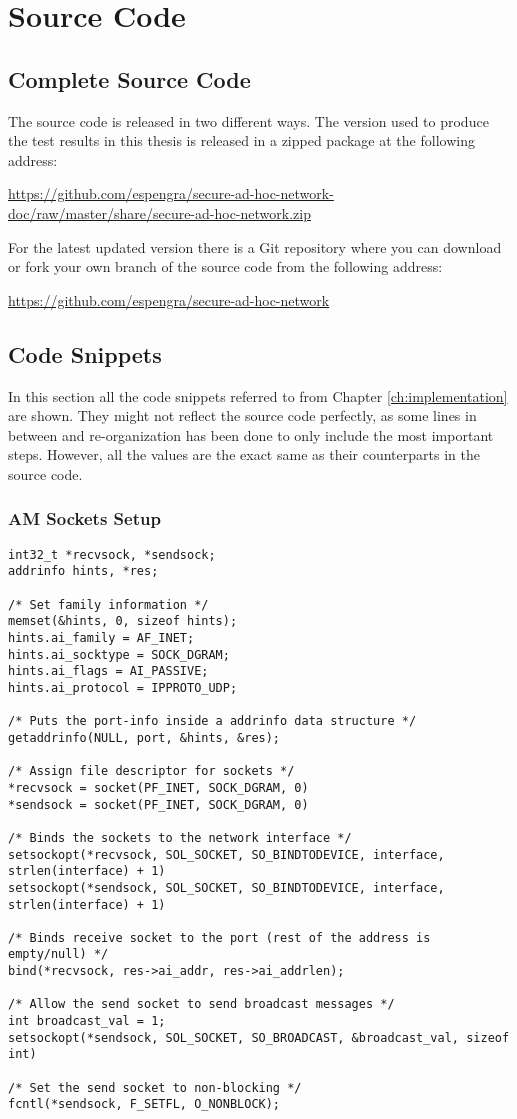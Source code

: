\chapter{Source Code}
\label{appendix:source}
\acresetall


\section{Complete Source Code}
The source code is released in two different ways. The version used to produce
the test results in this thesis is released in a zipped package at the following
address:

\url{https://github.com/espengra/secure-ad-hoc-network-doc/raw/master/share/secure-ad-hoc-network.zip}

For the latest updated version there is a Git repository where you can download
or fork your own branch of the source code from the following address:

\url{https://github.com/espengra/secure-ad-hoc-network}


\section{Code Snippets}
In this section all the code snippets referred to from Chapter
\ref{ch:implementation} are shown. They might not reflect the source code
perfectly, as some lines in between and re-organization has been done to only
include the most important steps. However, all the values are the exact same as
their counterparts in the source code.

\subsection{AM Sockets Setup}\label{code:sockets}
\begin{lstlisting}[frame=tb]
int32_t *recvsock, *sendsock;
addrinfo hints, *res;

/* Set family information */
memset(&hints, 0, sizeof hints);
hints.ai_family = AF_INET;
hints.ai_socktype = SOCK_DGRAM;
hints.ai_flags = AI_PASSIVE;
hints.ai_protocol = IPPROTO_UDP;

/* Puts the port-info inside a addrinfo data structure */
getaddrinfo(NULL, port, &hints, &res);

/* Assign file descriptor for sockets */
*recvsock = socket(PF_INET, SOCK_DGRAM, 0)
*sendsock = socket(PF_INET, SOCK_DGRAM, 0)

/* Binds the sockets to the network interface */
setsockopt(*recvsock, SOL_SOCKET, SO_BINDTODEVICE, interface, strlen(interface) + 1)
setsockopt(*sendsock, SOL_SOCKET, SO_BINDTODEVICE, interface, strlen(interface) + 1)

/* Binds receive socket to the port (rest of the address is empty/null) */
bind(*recvsock, res->ai_addr, res->ai_addrlen);

/* Allow the send socket to send broadcast messages */
int broadcast_val = 1;
setsockopt(*sendsock, SOL_SOCKET, SO_BROADCAST, &broadcast_val, sizeof int)

/* Set the send socket to non-blocking */
fcntl(*sendsock, F_SETFL, O_NONBLOCK);

\end{lstlisting}

